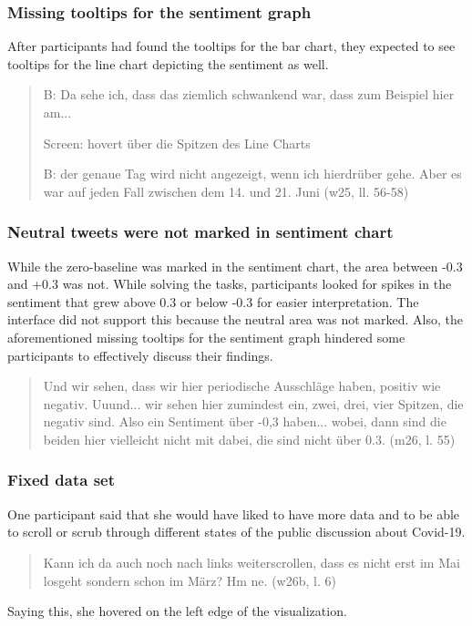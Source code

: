 \subsubsection*{Missing tooltips for the sentiment graph}
After participants had found the tooltips for the bar chart, they expected to see tooltips for the line chart depicting the sentiment as well.

\begin{quote}
    B: Da sehe ich, dass das ziemlich schwankend war, dass zum Beispiel hier am... 

    Screen: hovert über die Spitzen des Line Charts

    B: der genaue Tag wird nicht angezeigt, wenn ich hierdrüber gehe. Aber es war auf jeden Fall zwischen dem 14. und 21. Juni (w25, ll. 56-58)
\end{quote}

\subsubsection*{Neutral tweets were not marked in sentiment chart}
While the zero-baseline was marked in the sentiment chart, the area between -0.3 and +0.3 was not. While solving the tasks, participants looked for spikes in the sentiment that grew above 0.3 or below -0.3 for easier interpretation. The interface did not support this because the neutral area was not marked. Also, the aforementioned missing tooltips for the sentiment graph hindered some participants to effectively discuss their findings.

\begin{quote}
    Und wir sehen, dass wir hier periodische Ausschläge haben, positiv wie negativ. Uuund... wir sehen hier zumindest ein, zwei, drei, vier Spitzen, die negativ sind. Also ein Sentiment über -0,3 haben... wobei, dann sind die beiden hier vielleicht nicht mit dabei, die sind nicht über 0.3. (m26, l. 55)
\end{quote}

\subsubsection*{Fixed data set}
One participant said that she would have liked to have more data and to be able to scroll or scrub through different states of the public discussion about Covid-19.

\begin{quote}
    Kann ich da auch noch nach links weiterscrollen, dass es nicht erst im Mai losgeht sondern schon im März? Hm ne. (w26b, l. 6)
\end{quote}

Saying this, she hovered on the left edge of the visualization. 
